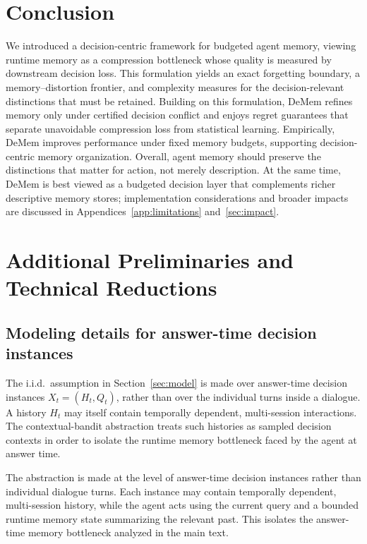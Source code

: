 \documentclass{article}
\theoremstyle{plain}
\theoremstyle{definition}
\theoremstyle{remark}
\begin{document}
\vspace{-0.5em}
\section{Conclusion}
\vspace{-0.5em}
We introduced a decision-centric framework for budgeted agent memory, viewing
runtime memory as a compression bottleneck whose quality is measured by
downstream decision loss. This formulation yields an exact forgetting boundary,
a memory--distortion frontier, and complexity measures for the
decision-relevant distinctions that must be retained.
Building on this formulation, DeMem refines memory only under certified
decision conflict and enjoys regret guarantees that separate unavoidable
compression loss from statistical learning. Empirically, DeMem improves
performance under fixed memory budgets, supporting decision-centric memory
organization.
Overall, agent memory should preserve the distinctions that matter for action,
not merely description. At the same time, DeMem is best viewed as a budgeted decision layer that
complements richer descriptive memory stores; implementation considerations
and broader impacts are discussed in Appendices~\ref{app:limitations}
and~\ref{sec:impact}.





\newpage

\appendix
\section{Additional Preliminaries and Technical Reductions}
\label{app:theory}
\subsection{Modeling details for answer-time decision instances}
\label{app:model-details}

The i.i.d.\ assumption in Section~\ref{sec:model} is made over
answer-time decision instances \(X_t=(H_t,Q_t)\), rather than over the
individual turns inside a dialogue. A history \(H_t\) may itself contain
temporally dependent, multi-session interactions. The contextual-bandit
abstraction treats such histories as sampled decision contexts in order to
isolate the runtime memory bottleneck faced by the agent at answer time.

The abstraction is made at the level of answer-time decision instances rather
than individual dialogue turns. Each instance may contain temporally dependent,
multi-session history, while the agent acts using the current query and a
bounded runtime memory state summarizing the relevant past. This isolates the
answer-time memory bottleneck analyzed in the main text.
\end{document}

